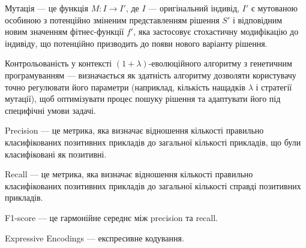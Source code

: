 Мутація --- це функція \( M: I \rightarrow I' \), де \( I \) — оригінальний індивід, \( I' \) є мутованою особиною з потенційно зміненим представленням рішення \( S' \) і відповідним новим значенням фітнес-функції \( f' \), яка застосовує стохастичну модифікацію до індивіду, що потенційно призводить до появи нового варіанту рішення.

Контрольованість у контексті $(1+\lambda)$-еволюційного алгоритму з генетичним програмуванням --- визначається як здатність алгоритму дозволяти користувачу точно регулювати його параметри (наприклад, кількість нащадків $\lambda$ і стратегії мутації), щоб оптимізувати процес пошуку рішення та адаптувати його під специфічні умови задачі.

Precision --- це метрика, яка визначає відношення кількості правильно класифікованих позитивних прикладів до загальної кількості прикладів, що були класифіковані як позитивні.

Recall --- це метрика, яка визначає відношення кількості правильно класифікованих позитивних прикладів до загальної кількості справді позитивних прикладів.

F1-score --- це гармонійне середнє між precision та recall.

Expressive Encodings --- експресивне кодування.